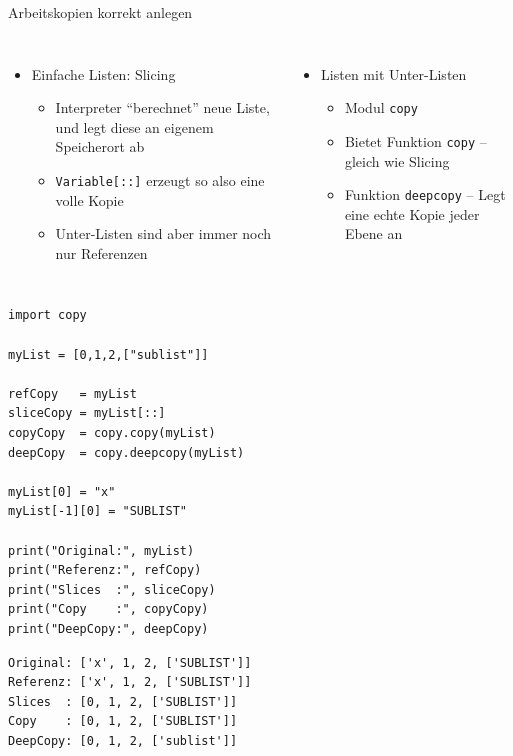 
\begin{frame}[fragile]{Arbeitskopien korrekt anlegen}
%
\begin{columns}[T]
\begin{itemize}
\item Einfache Listen: Slicing
	\begin{itemize}
	\item Interpreter \enquote{berechnet} neue Liste, und legt diese an eigenem Speicherort ab
	\item \texttt{Variable[::]} erzeugt so also eine volle Kopie
	\item Unter-Listen sind aber immer noch nur Referenzen
	\end{itemize}
\end{itemize}
%
\begin{itemize}
\item Listen mit Unter-Listen
	\begin{itemize}
	\item Modul \texttt{copy}
	\item Bietet Funktion \texttt{copy} -- gleich wie Slicing
	\item Funktion \texttt{deepcopy} -- Legt eine echte Kopie jeder Ebene an
	\end{itemize}
\end{itemize}
\end{columns}
%
\end{frame}


\begin{frame}[fragile]
%
\begin{tcbraster}[raster columns=2,
                  raster equal height,
                  nobeforeafter,
                  raster column skip=0.5cm]
\begin{codebox}
\begin{verbatim}
import copy

myList = [0,1,2,["sublist"]]

refCopy   = myList
sliceCopy = myList[::]
copyCopy  = copy.copy(myList)
deepCopy  = copy.deepcopy(myList)

myList[0] = "x"
myList[-1][0] = "SUBLIST"

print("Original:", myList)
print("Referenz:", refCopy)
print("Slices  :", sliceCopy)
print("Copy    :", copyCopy)
print("DeepCopy:", deepCopy)
\end{verbatim}
\end{codebox}
%
\begin{cmdbox}[Ausgabe]
\begin{verbatim}
Original: ['x', 1, 2, ['SUBLIST']]
Referenz: ['x', 1, 2, ['SUBLIST']]
Slices  : [0, 1, 2, ['SUBLIST']]
Copy    : [0, 1, 2, ['SUBLIST']]
DeepCopy: [0, 1, 2, ['sublist']]
\end{verbatim}
\end{cmdbox}
\end{tcbraster}
%
\end{frame}

